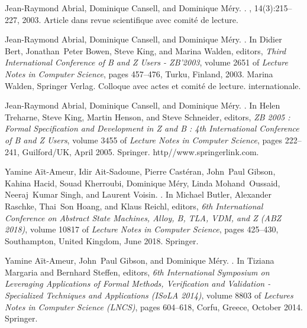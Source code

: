 \documentclass[ 12pt]{article}
\begin{document}
\begin{thebibliography}{100}
Jean-Raymond Abrial, Dominique Cansell, and Dominique M{\'e}ry.
.
, 14(3):215--227, 2003.
\newblock Article dans revue scientifique avec comit{\'e} de lecture.

Jean-Raymond Abrial, Dominique Cansell, and Dominique M{\'e}ry.
.
\newblock In Didier Bert, Jonathan~Peter Bowen, Steve King, and Marina Walden,
  editors, {\em {Third International Conference of B and Z Users - ZB'2003}},
  volume 2651 of {\em Lecture Notes in Computer Science}, pages 457--476,
  Turku, Finland, 2003. {Marina Walden}, {Springer Verlag}.
\newblock Colloque avec actes et comit{\'e} de lecture. internationale.

Jean-Raymond Abrial, Dominique Cansell, and Dominique M{\'e}ry.
.
\newblock In Helen Treharne, Steve King, Martin Henson, and Steve Schneider,
  editors, {\em {ZB 2005 : Formal Specification and Development in Z and B :
  4th International Conference of B and Z Users}}, volume 3455 of {\em Lecture
  Notes in Computer Science}, pages 222--241, Guilford/UK, April 2005.
  {Springer}.
\newblock http//www.springerlink.com.

Yamine A{\"i}t-Ameur, Idir Ait-Sadoune, Pierre Cast{\'e}ran, John~Paul Gibson,
  Kahina Hacid, Souad Kherroubi, Dominique M{\'e}ry, Linda Mohand~Oussaid,
  Neeraj~Kumar Singh, and Laurent Voisin.
.
\newblock In Michael Butler, Alexander Raschke, Thai~Son Hoang, and Klaus
  Reichl, editors, {\em {6th International Conference on Abstract State
  Machines, Alloy, B, TLA, VDM, and Z (ABZ 2018)}}, volume 10817 of {\em
  Lecture Notes in Computer Science}, pages 425--430, Southampton, United
  Kingdom, June 2018. {Springer}.

Yamine A{\"i}t-Ameur, John~Paul Gibson, and Dominique M{\'e}ry.
.
\newblock In Tiziana Margaria and Bernhard Steffen, editors, {\em {6th
  International Symposium on Leveraging Applications of Formal Methods,
  Verification and Validation - Specialized Techniques and Applications (ISoLA
  2014)}}, volume 8803 of {\em Lectures Notes in Computer Science (LNCS)},
  pages 604--618, Corfu, Greece, October 2014. {Springer}.


\end{thebibliography}
\end{document}
